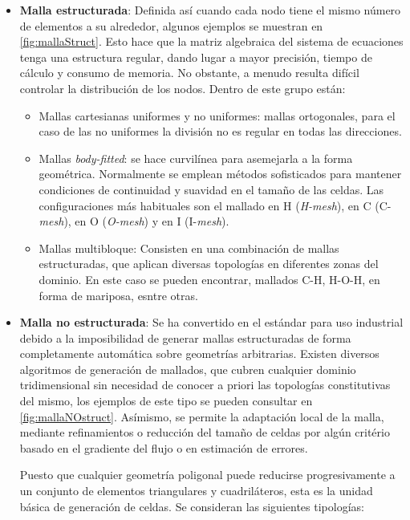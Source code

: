 \begin{itemize}
\item
  \textbf{Malla estructurada}: Definida así cuando cada nodo tiene el
  mismo número de elementos a su alrededor, algunos ejemplos se muestran en \autoref{fig:mallaStruct}. Esto hace que la matriz
  algebraica del sistema de ecuaciones tenga una estructura regular,
  dando lugar a mayor precisión, tiempo de cálculo y consumo de memoria.
  No obstante, a menudo resulta difícil controlar la distribución de los
  nodos. Dentro de este grupo están:

  \begin{itemize}
  \item
    Mallas cartesianas uniformes y no uniformes: mallas ortogonales,
    para el caso de las no uniformes la división no es regular en todas
    las direcciones.
  \item
    Mallas \emph{body-fitted}: se hace curvilínea para asemejarla a la
    forma geométrica. Normalmente se emplean métodos sofisticados para
    mantener condiciones de continuidad y suavidad en el tamaño de las
    celdas. Las configuraciones más habituales son el mallado en H
    (\emph{H-mesh}), en C (C-\emph{mesh}), en O (\emph{O-mesh}) y en I
    (I-\emph{mesh}).
  \item
    Mallas multibloque: Consisten en una combinación de mallas
    estructuradas, que aplican diversas topologías en diferentes zonas
    del dominio. En este caso se pueden encontrar, mallados C-H, H-O-H,
    en forma de mariposa, esntre otras.
  \end{itemize}
\item
  \textbf{Malla no estructurada}: Se ha convertido en el estándar para
  uso industrial debido a la imposibilidad de generar mallas
  estructuradas de forma completamente automática sobre geometrías
  arbitrarias. Existen diversos algoritmos de generación de mallados,
  que cubren cualquier dominio tridimensional sin necesidad de conocer a
  priori las topologías constitutivas del mismo, los ejemplos de este tipo se pueden consultar en \autoref{fig:mallaNOstruct}. Asímismo, se permite la
  adaptación local de la malla, mediante refinamientos o reducción del
  tamaño de celdas por algún critério basado en el gradiente del flujo o
  en estimación de errores.

  Puesto que cualquier geometría poligonal puede reducirse
  progresivamente a un conjunto de elementos triangulares y
  cuadriláteros, esta es la unidad básica de generación de celdas. Se
  consideran las siguientes tipologías:


\end{itemize}
